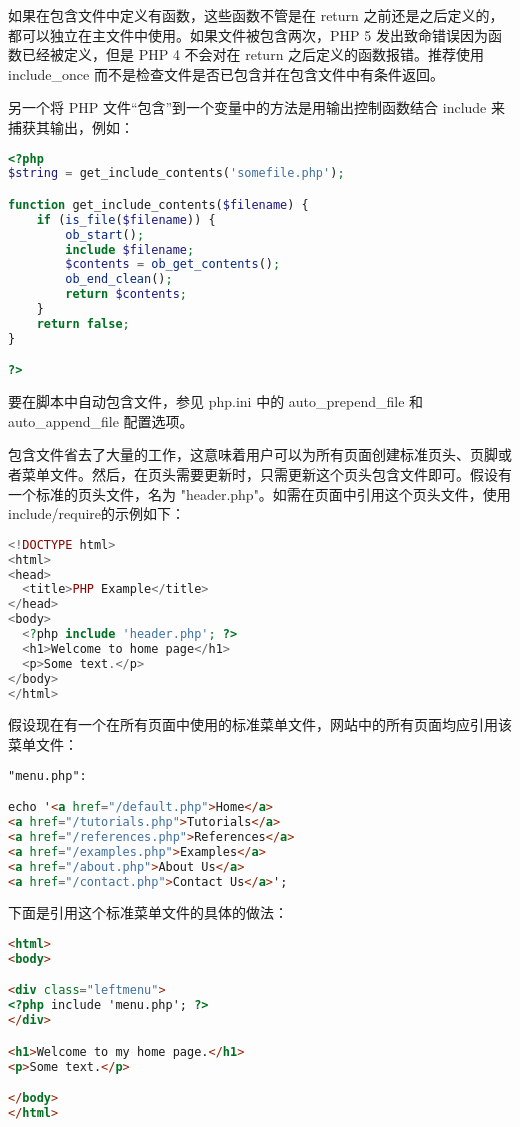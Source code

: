 如果在包含文件中定义有函数，这些函数不管是在 return 之前还是之后定义的，都可以独立在主文件中使用。如果文件被包含两次，PHP 5 发出致命错误因为函数已经被定义，但是 PHP 4 不会对在 return 之后定义的函数报错。推荐使用 include\_once 而不是检查文件是否已包含并在包含文件中有条件返回。

另一个将 PHP 文件“包含”到一个变量中的方法是用输出控制函数结合 include 来捕获其输出，例如：


\begin{lstlisting}[language=PHP]
<?php
$string = get_include_contents('somefile.php');

function get_include_contents($filename) {
    if (is_file($filename)) {
        ob_start();
        include $filename;
        $contents = ob_get_contents();
        ob_end_clean();
        return $contents;
    }
    return false;
}

?>
\end{lstlisting}

要在脚本中自动包含文件，参见 php.ini 中的 auto\_prepend\_file 和 auto\_append\_file 配置选项。

包含文件省去了大量的工作，这意味着用户可以为所有页面创建标准页头、页脚或者菜单文件。然后，在页头需要更新时，只需更新这个页头包含文件即可。假设有一个标准的页头文件，名为 "header.php"。如需在页面中引用这个页头文件，使用 include/require的示例如下：


\begin{lstlisting}[language=PHP]
<!DOCTYPE html>
<html>
<head>
  <title>PHP Example</title>
</head>
<body>
  <?php include 'header.php'; ?>
  <h1>Welcome to home page</h1>
  <p>Some text.</p>
</body>
</html>
\end{lstlisting}

假设现在有一个在所有页面中使用的标准菜单文件，网站中的所有页面均应引用该菜单文件：

\begin{lstlisting}[language=HTML]
"menu.php":

echo '<a href="/default.php">Home</a>
<a href="/tutorials.php">Tutorials</a>
<a href="/references.php">References</a>
<a href="/examples.php">Examples</a>
<a href="/about.php">About Us</a>
<a href="/contact.php">Contact Us</a>';
\end{lstlisting}

下面是引用这个标准菜单文件的具体的做法：

\begin{lstlisting}[language=HTML]
<html>
<body>

<div class="leftmenu">
<?php include 'menu.php'; ?>
</div>

<h1>Welcome to my home page.</h1>
<p>Some text.</p>

</body>
</html>
\end{lstlisting}


